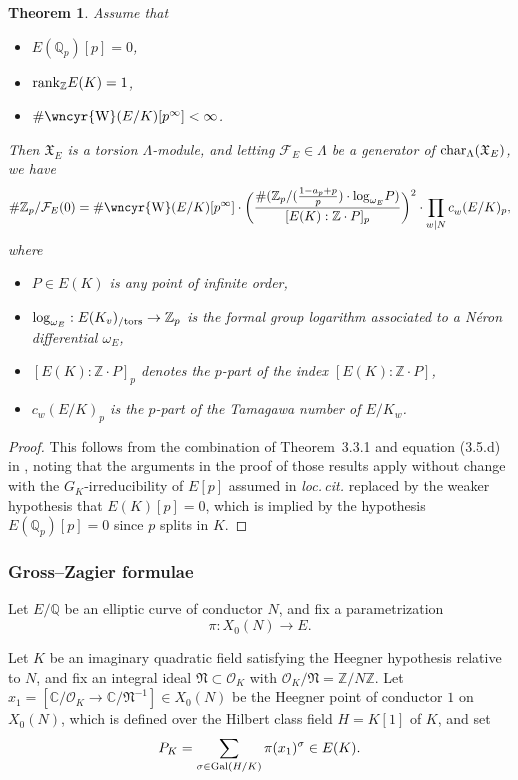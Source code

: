 \documentclass[10pt]{amsart}
\newcommand{\sha}{\text{\wncyr{W}}}
\numberwithin{equation}{section}
\newtheorem{theorem}{Theorem}
\theoremstyle{definition}
\theoremstyle{remark}
\newcommand{\Z}{\mathbb{Z}}
\newcommand{\Fcal}{\mathcal{F}}
\newcommand{\bZ}{\mathbb{Z}}
\newcommand{\bQ}{\mathbb{Q}}
\begin{document}
\begin{theorem}\label{controlthm}
Assume that
\begin{itemize}
\item $E(\bQ_p)[p]=0$,
\item{} ${\rm rank}_{\Z}E(K)=1$,
\item{} $\#\sha(E/K)[p^\infty]<\infty$.
\end{itemize}
Then $\mathfrak{X}_E$ is a torsion $\Lambda$-module, and letting $\Fcal_E\in\Lambda$ be a generator of ${\rm char}_\Lambda(\mathfrak{X}_E)$, we have
\[
\# \Z_p /\Fcal_E(0) = 
\# \sha(E/K)[p^\infty]\cdot\biggl(  \dfrac{ \# (\Z_p / ( \frac{1-a_p+p}{p}) \cdot \mathrm{log}_{\omega_E} P) }{ [E(K): \Z\cdot P]_p }\biggr)^2\cdot\prod_{w\mid N} c_w^{}(E/K)_p,
\]	
where
\begin{itemize}
\item $P\in E(K)$ is any point of infinite order, 
\item $\log_{\omega_E}:E(K_v)_{/{\rm tors}}\rightarrow\bZ_p$ is the formal group logarithm associated to a N\'{e}ron differential $\omega_E$, 
\item $[E(K):\Z\cdot P]_p$ denotes the $p$-part of the index $[E(K):\Z\cdot P]$,
\item $c_w^{}(E/K)_p$ is the $p$-part of the Tamagawa number of $E/K_w$.
\end{itemize}
\end{theorem}

\begin{proof}
This follows from the combination of Theorem~3.3.1 and equation (3.5.d) in \cite[(3.5.d)]{jsw}, noting that the arguments in the proof of those results apply without change with the $G_K$-irreducibility of $E[p]$ assumed in \emph{loc.\,cit.} replaced by the weaker hypothesis that $E(K)[p]=0$, {which 
is implied by the hypothesis $E(\bQ_p)[p]=0$ since $p$ splits in $K$}. 
\end{proof}

 
\subsubsection{Gross--Zagier formulae}

Let $E/\bQ$ be an elliptic curve of conductor $N$, and fix a  parametrization
\[
\pi:X_0(N)\rightarrow E.
\]

Let $K$ be an imaginary quadratic field 
satisfying the Heegner hypothesis relative to $N$, and fix an integral ideal $\mathfrak{N}\subset\mathcal{O}_K$ with $\mathcal{O}_K/\mathfrak{N}=\Z/N\Z$. Let $x_1=[\mathbb{C}/\mathcal{O}_K\rightarrow\mathbb{C}/\mathfrak{N}^{-1}]\in X_0(N)$ 
be the Heegner point of conductor $1$ on $X_0(N)$, which is defined over the Hilbert class field $H=K[1]$ of $K$, and set
\[
P_K=\sum_{\sigma\in{\rm Gal}(H/K)}\pi(x_1)^\sigma\in E(K).
\]
\end{document}
